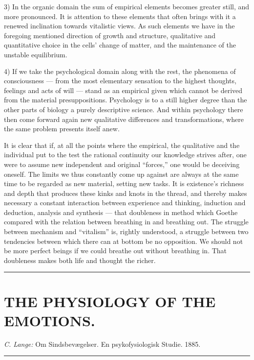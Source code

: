 \documentclass[12pt,a4paper,openany]{book}
\newcommand{\opage}[1]{\marginnote{\footnotesize\textit{[#1]}}}
\newcommand{\essay}[2][]{\chapter*{#2}\addcontentsline{toc}{chapter}{#1}}
\newcommand{\streg}{\begin{center}\rule{3em}{0.4pt}\end{center}}
\begin{document}
3) In the organic domain the sum of empirical elements becomes greater still,
and more pronounced. It is attention to these elements that often brings with it
a renewed inclination towards vitalistic views. As such elements we have in the
foregoing mentioned direction of growth and structure, qualitative and
quantitative choice in the cells' change of matter, and the maintenance of the
unstable equilibrium.

4) If we take the psychological domain along with the rest,
\opage{50}the phenomena of consciousness ---
from the most elementary sensation to the highest thoughts, feelings and acts of
will --- stand as an empirical given which cannot be derived from the material
presuppositions. Psychology is to a still higher degree than the other parts of
biology a purely descriptive science. And within psychology there then come
forward again new qualitative differences and transformations, where the same
problem presents itself anew.

It is clear that if, at all the points where the empirical, the qualitative and
the individual put to the test the rational continuity our knowledge strives
after, one were to assume new independent and original ``forces,'' one would be
deceiving oneself. The limits we thus constantly come up against are always at
the same time to be regarded as new material, setting new tasks. It is
existence's richness and depth that produces these kinks and knots in the
thread, and thereby makes necessary a constant interaction %
 between experience
and thinking, induction and deduction, analysis and synthesis --- that doubleness
in method which Goethe compared with the relation between breathing in and
breathing out. The struggle between mechanism and ``vitalism'' is, rightly
understood, a struggle between two tendencies between which there can at bottom
be no opposition. We should not be more perfect beings if we could breathe out
without breathing in. That doubleness makes both life and thought the richer.

\streg{}

\opage{51}
\essay[The Physiology of the Emotions]{THE PHYSIOLOGY OF THE EMOTIONS.}

\begin{center}\emph{C. Lange:} Om Sindsbevægelser. En psykofysiologisk Studie. 1885.\end{center}

\streg{}
\end{document}
